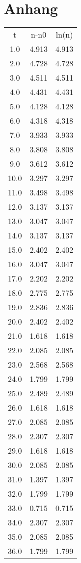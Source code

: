 \section{Anhang}
\begin{table}
\begin{tabular}{ccc}
t & n-n0 & ln(n) \\
1.0 & 4.913 & 4.913 \\
2.0 & 4.728 & 4.728 \\
3.0 & 4.511 & 4.511 \\
4.0 & 4.431 & 4.431 \\
5.0 & 4.128 & 4.128 \\
6.0 & 4.318 & 4.318 \\
7.0 & 3.933 & 3.933 \\
8.0 & 3.808 & 3.808 \\
9.0 & 3.612 & 3.612 \\
10.0 & 3.297 & 3.297 \\
11.0 & 3.498 & 3.498 \\
12.0 & 3.137 & 3.137 \\
13.0 & 3.047 & 3.047 \\
14.0 & 3.137 & 3.137 \\
15.0 & 2.402 & 2.402 \\
16.0 & 3.047 & 3.047 \\
17.0 & 2.202 & 2.202 \\
18.0 & 2.775 & 2.775 \\
19.0 & 2.836 & 2.836 \\
20.0 & 2.402 & 2.402 \\
21.0 & 1.618 & 1.618 \\
22.0 & 2.085 & 2.085 \\
23.0 & 2.568 & 2.568 \\
24.0 & 1.799 & 1.799 \\
25.0 & 2.489 & 2.489 \\
26.0 & 1.618 & 1.618 \\
27.0 & 2.085 & 2.085 \\
28.0 & 2.307 & 2.307 \\
29.0 & 1.618 & 1.618 \\
30.0 & 2.085 & 2.085 \\
31.0 & 1.397 & 1.397 \\
32.0 & 1.799 & 1.799 \\
33.0 & 0.715 & 0.715 \\
34.0 & 2.307 & 2.307 \\
35.0 & 2.085 & 2.085 \\
36.0 & 1.799 & 1.799 \\

\end{tabular}
\end{table}
